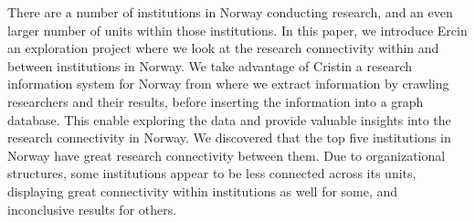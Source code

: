 There are a number of institutions in Norway conducting research, and an even larger number of units within those institutions.
In this paper, we introduce Ercin an exploration project where we look at the research connectivity within and between institutions in Norway. We take advantage of Cristin\cite{CRISTIN-about} a research information system for Norway from where we extract information by crawling researchers and their results, before inserting the information into a graph database.
This enable exploring the data and provide valuable insights into the research connectivity in Norway.
We discovered that the top five institutions in Norway have great research connectivity between them.
Due to organizational structures, some institutions appear to be less connected across its units, displaying great connectivity within institutions as well for some, and inconclusive results for others.
